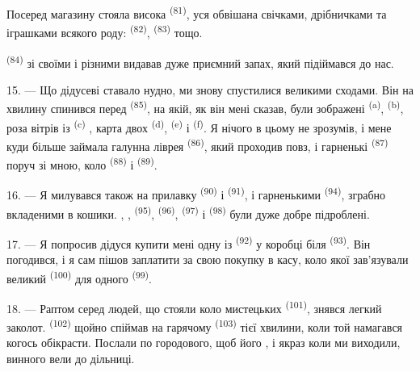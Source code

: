 Посеред магазину стояла висока  \textsuperscript{(81)},
уся обвішана свічками, дрібничками та іграшками всякого роду:
 \textsuperscript{(82)}, 
\textsuperscript{(83)} тощо.

 \textsuperscript{(84)} зі своїми  і різними  видавав дуже приємний запах, який
підіймався до нас.

\VUsaut{3.4mm}
\VUsaut{2.8mm}

15. --- Що дідусеві ставало нудно, ми знову спустилися великими сходами. Він на
хвилину спинився перед  \textsuperscript{(85)}, на
якій, як він мені сказав, були зображені  \textsuperscript{(a)},
 \textsuperscript{(b)}, роза вітрів із
 \textsuperscript{(c)} , карта двох  \textsuperscript{(d)},
 \textsuperscript{(e)} і 
\textsuperscript{(f)}. Я нічого в цьому не зрозумів, і мене куди більше займала
галунна ліврея  \textsuperscript{(86)}, який проходив повз, і
гарненькі  \textsuperscript{(87)} поруч зі мною, коло
 \textsuperscript{(88)} і 
\textsuperscript{(89)}.

16. --- Я милувався також на прилавку  \textsuperscript{(90)} і
 \textsuperscript{(91)}, і гарненькими  \textsuperscript{(94)}, зграбно вкладеними в кошики. ,
,  \textsuperscript{(95)}, 
\textsuperscript{(96)},  \textsuperscript{(97)} і
 \textsuperscript{(98)} були дуже добре підроблені.

\VUsaut{4.4mm}
\VUsaut{2.8mm}

17. --- Я попросив дідуся купити мені одну із 
\textsuperscript{(92)} у коробці біля  \textsuperscript{(93)}. Він
погодився, і я сам пішов заплатити за свою покупку в касу, коло якої
зав'язували великий  \textsuperscript{(100)} для одного
 \textsuperscript{(99)}.

18. --- Раптом серед людей, що стояли коло мистецьких 
\textsuperscript{(101)}, знявся легкий заколот. 
\textsuperscript{(102)} щойно спіймав на гарячому 
\textsuperscript{(103)} тієї хвилини, коли той намагався когось обікрасти.
Послали по городового, щоб його , і якраз коли ми виходили,
винного вели до дільниці.
\VUsaut{6.0mm}
\VUfilet{22mm}
